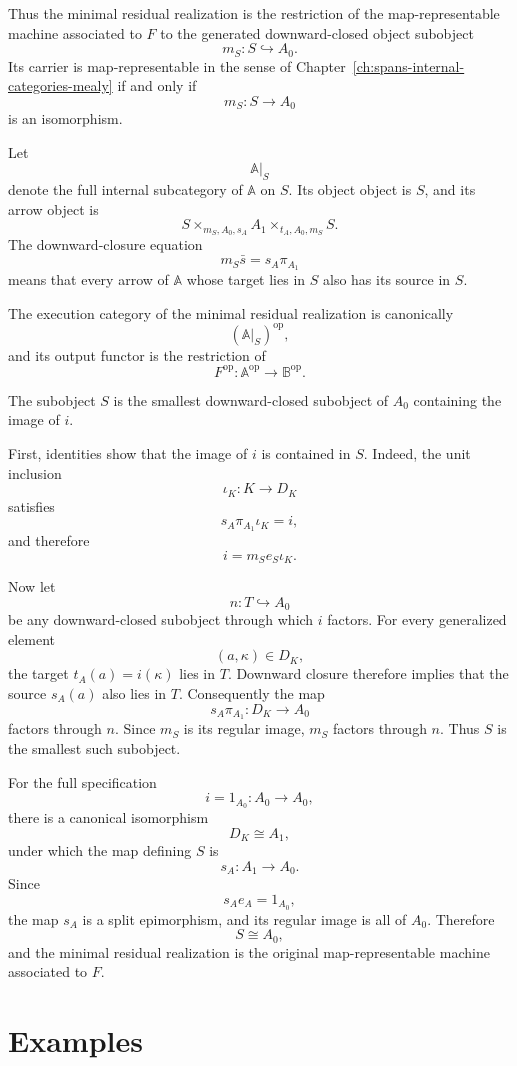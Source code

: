Thus the minimal residual realization is the restriction of the
map-representable machine associated to \(F\) to the generated
downward-closed object subobject
\[
    m_S:S\hookrightarrow A_0.
\]
Its carrier is map-representable in the sense of
Chapter~\ref{ch:spans-internal-categories-mealy} if and only if
\[
    m_S:S\to A_0
\]
is an isomorphism.

Let
\[
    \mathbb A|_S
\]
denote the full internal subcategory of \(\mathbb A\) on \(S\). Its object
object is \(S\), and its arrow object is
\[
    S
    \times_{m_S,A_0,s_A}
    A_1
    \times_{t_A,A_0,m_S}
    S.
\]
The downward-closure equation
\[
    m_S\bar s=s_A\pi_{A_1}
\]
means that every arrow of \(\mathbb A\) whose target lies in \(S\) also has
its source in \(S\).

The execution category of the minimal residual realization is canonically
\[
    (\mathbb A|_S)^{\mathrm{op}},
\]
and its output functor is the restriction of
\[
    F^{\mathrm{op}}:
    \mathbb A^{\mathrm{op}}\to\mathbb B^{\mathrm{op}}.
\]

The subobject \(S\) is the smallest downward-closed subobject of \(A_0\)
containing the image of \(i\).

First, identities show that the image of \(i\) is contained in \(S\). Indeed,
the unit inclusion
\[
    \iota_K:K\to D_K
\]
satisfies
\[
    s_A\pi_{A_1}\iota_K=i,
\]
and therefore
\[
    i=m_Se_S\iota_K.
\]

Now let
\[
    n:T\hookrightarrow A_0
\]
be any downward-closed subobject through which \(i\) factors. For every
generalized element
\[
    (a,\kappa)\in D_K,
\]
the target \(t_A(a)=i(\kappa)\) lies in \(T\). Downward closure therefore
implies that the source \(s_A(a)\) also lies in \(T\). Consequently the map
\[
    s_A\pi_{A_1}:D_K\to A_0
\]
factors through \(n\). Since \(m_S\) is its regular image, \(m_S\) factors
through \(n\). Thus \(S\) is the smallest such subobject.

For the full specification
\[
    i=1_{A_0}:A_0\to A_0,
\]
there is a canonical isomorphism
\[
    D_K\cong A_1,
\]
under which the map defining \(S\) is
\[
    s_A:A_1\to A_0.
\]
Since
\[
    s_Ae_A=1_{A_0},
\]
the map \(s_A\) is a split epimorphism, and its regular image is all of
\(A_0\). Therefore
\[
    S\cong A_0,
\]
and the minimal residual realization is the original map-representable
machine associated to \(F\).

\section{Examples}
\label{sec:behaviour-myhill-nerode-examples}

